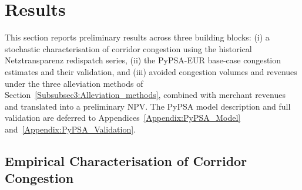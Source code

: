 \section{Results}\label{Sec4:Results}
This section reports preliminary results across three building blocks: (i) a stochastic characterisation of corridor congestion using the historical Netztransparenz redispatch series, (ii) the PyPSA-EUR base-case congestion estimates and their validation, and (iii) avoided congestion volumes and revenues under the three alleviation methods of Section~\ref{Subsubsec3:Alleviation_methods}, combined with merchant revenues and translated into a preliminary NPV. The PyPSA model description and full validation are deferred to Appendices~\ref{Appendix:PyPSA_Model} and~\ref{Appendix:PyPSA_Validation}.
 
\subsection{Empirical Characterisation of Corridor Congestion}\label{Subsec4:Empirical_Congestion}
 
